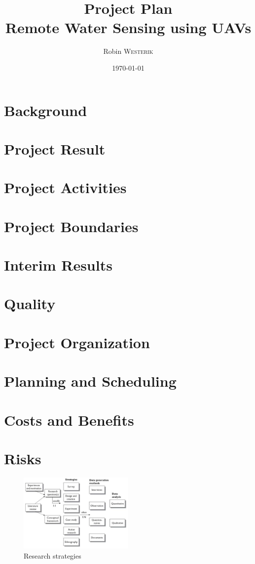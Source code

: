 \documentclass[11pt, a4paper]{article}
\title{Project Plan\\Remote Water Sensing using UAVs}
\author{Robin \textsc{Westerik}}
\date{\today}
\begin{document}


\tableofcontents
\pagebreak

\section{Background}

\section{Project Result}

\section{Project Activities}

\section{Project Boundaries}

\section{Interim Results}

\section{Quality}

\section{Project Organization}

\section{Planning and Scheduling}

\section{Costs and Benefits}

\section{Risks}

\begin{figure}[h]
    \center
    \includegraphics[width=0.5\textwidth]{research-strategies.png}
    \caption{Research strategies \cite{oates2005researching}}
    \label{fig:research_strategies}
\end{figure}

\printbibliography 
\end{document}
